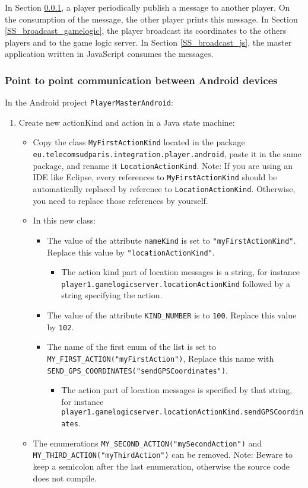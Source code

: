 In Section \ref{SS_point_to_point_android}, a player
periodically publish a message to another player. On the consumption of
the message, the other player prints this message. In
Section \ref{SS_broadcast_gamelogic}, the player broadcast its
coordinates to the others players and to the game logic server. In
Section \ref{SS_broadcast_js}, the master application written in
JavaScript consumes the messages.

\subsubsection{Point to point communication between Android devices}
\label{SS_point_to_point_android}

In the Android project \texttt{PlayerMasterAndroid}:

\begin{enumerate}
\item Create new \textsf{actionKind} and \textsf{action} in a Java
  state machine:
\begin{itemize}
\item Copy the class \texttt{MyFirstActionKind} located in the package
\texttt{eu.telecomsudparis.integration.player.android}, paste it in the same
package, and rename it \texttt{LocationActionKind}. 
\newline
Note: If you are using an IDE like
Eclipse, every references to  \texttt{MyFirstActionKind} should be automatically
replaced by reference to \texttt{LocationActionKind}. Otherwise, you need to
replace those references by yourself.
\item In this new class:
\begin{itemize}
\item The value of the attribute \texttt{nameKind} is set to
  \texttt{"myFirstActionKind"}. Replace this value by
  \texttt{"locationActionKind"}.
\begin{itemize}
\item The action kind part of location messages is a string,
  for instance \texttt{player1.gamelogicserver.locationActionKind}
  followed by a string specifying the action.
\end{itemize}
\item The value of the attribute \texttt{KIND\_NUMBER} is to \texttt{100}. 
Replace this value by \texttt{102}.
\item The name of the first enum of the list is set to
  \texttt{MY\_FIRST\_ACTION("myFirstAction")}, Replace this name with
  \texttt{SEND\_GPS\_COORDINATES("sendGPSCoordinates")}.
\begin{itemize}
\item The action part of location messages is specified by that string,
  for instance
  \texttt{player1.gamelogicserver.locationActionKind.sendGPSCoordinates}.
\end{itemize}
\end{itemize}
\item The enumerations \texttt{MY\_SECOND\_ACTION("mySecondAction")} and
  \texttt{MY\_THIRD\_ACTION("myThirdAction")} can be removed. Note:
  Beware to keep a semicolon after the last enumeration, otherwise the source
  code does not compile.
\end{itemize}


\end{enumerate}
